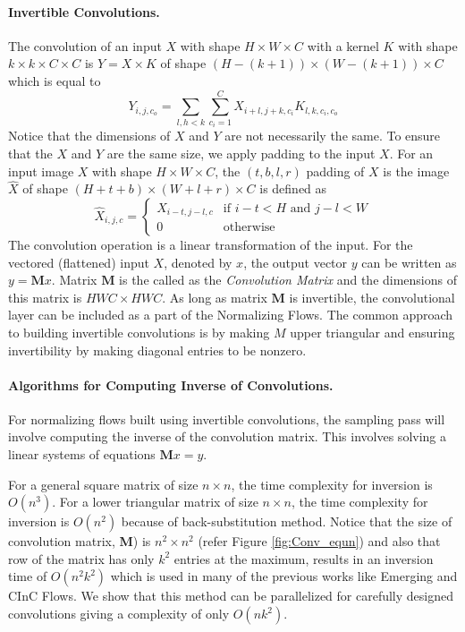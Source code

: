 \documentclass[a4paper,twoside]{article}
\theoremstyle{definition}
\begin{document}
\paragraph{Invertible Convolutions.}

The convolution of an input $X$ with shape $H \times W \times C$ with a kernel $K$ with shape $k \times k \times C \times C$ is $Y = X \times K$ of shape $(H - (k+1)) \times (W -  (k+1)) \times C$ which is equal to
\begin{equation}
Y_{i,j,c_o} = \sum_{l,h < k} \sum_{c_i=1}^{C} X_{i+l,j+k,c_i}K_{l,k,c_i,c_o} 
\end{equation}
Notice that the dimensions of $X$ and $Y$ are not necessarily the same. To ensure that the $X$ and $Y$ are the same size, we apply padding to the input $X$. For an input image $X$ with shape $H \times W \times C$, the $(t,b,l,r)$ padding of $X$ is the image $\hat{X}$ of shape $(H+t+b) \times (W+l+r) \times C$ is defined as
\begin{equation}
\hat{X}_{i, j, c} = 
    \begin{cases}
        X_{i-t, j-l, c} & \text{if } i - t < H \text{ and } j - l < W \\
        0 & \text{otherwise}
    \end{cases}
\end{equation}
The convolution operation is a linear transformation of the input. For the vectored (flattened) input $X$, denoted by $x$, the output vector $y$ can be written as  $y = \mathbf{M} x$. Matrix $\mathbf{M}$ is the called as the \emph{Convolution Matrix} and the dimensions of this matrix is $HWC \times HWC$. As long as matrix $\mathbf{M}$ is invertible, the convolutional layer can be included as a part of the Normalizing Flows. The common approach to building invertible convolutions is by making $M$ upper triangular and ensuring invertibility by making diagonal entries to be nonzero.



\paragraph{Algorithms for Computing Inverse of Convolutions.}
For normalizing flows built using invertible convolutions, the sampling pass will involve computing the inverse of the convolution matrix. This involves solving a linear systems of equations $\textbf{M}x =y$.

For a general square matrix of size $n \times n$, the time complexity for inversion is $O( n^3)$. For a lower triangular matrix of size $n \times n$, the time complexity for inversion is $O(n^2)$ because of back-substitution method. Notice that the size of convolution matrix, \textbf{M}) is $n^2 \times n^2$ (refer Figure \ref{fig:Conv_equn}) and also that row of the matrix has only $k^2$ entries at the maximum, results in an inversion time of $O(n^{2} k^{2})$ which is used in many of the previous works like Emerging and CInC Flows. We show that this method can be parallelized for carefully designed convolutions giving a complexity of only $O(n k^2)$.
\end{document}
